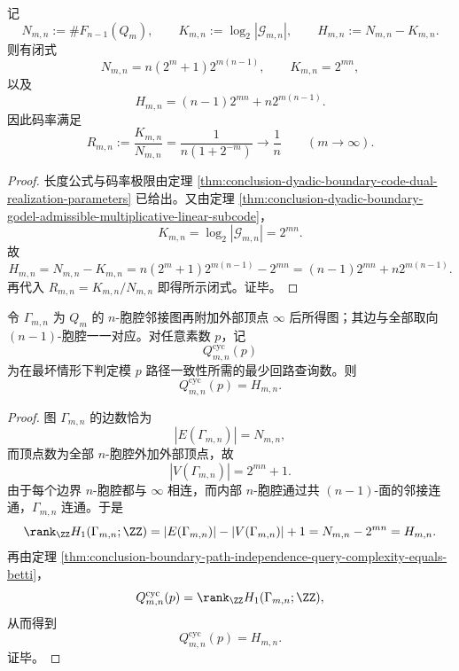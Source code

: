 \begin{corollary}\label{cor:conclusion-dyadic-boundary-godel-code-parameters-and-check-rank}
记
\[
N_{m,n}:=\#F_{n-1}(Q_m),
\qquad
K_{m,n}:=\log_2|\mathcal G_{m,n}|,
\qquad
H_{m,n}:=N_{m,n}-K_{m,n}.
\]
则有闭式
\[
N_{m,n}=n(2^m+1)2^{m(n-1)},
\qquad
K_{m,n}=2^{mn},
\]
以及
\[
H_{m,n}=(n-1)2^{mn}+n2^{m(n-1)}.
\]
因此码率满足
\[
R_{m,n}:=\frac{K_{m,n}}{N_{m,n}}
=
\frac{1}{n(1+2^{-m})}
\longrightarrow
\frac1n
\qquad (m\to\infty).
\]
\end{corollary}

\begin{proof}
长度公式与码率极限由定理 \ref{thm:conclusion-dyadic-boundary-code-dual-realization-parameters} 已给出。又由定理 \ref{thm:conclusion-dyadic-boundary-godel-admissible-multiplicative-linear-subcode}，
\[
K_{m,n}=\log_2|\mathcal G_{m,n}|=2^{mn}.
\]
故
\[
H_{m,n}=N_{m,n}-K_{m,n}
=
n(2^m+1)2^{m(n-1)}-2^{mn}
=
(n-1)2^{mn}+n2^{m(n-1)}.
\]
再代入 \(R_{m,n}=K_{m,n}/N_{m,n}\) 即得所示闭式。证毕。
\end{proof}

\begin{theorem}\label{thm:conclusion-dyadic-boundary-path-consistency-query-rank-equals-check-rank}
令 \(\Gamma_{m,n}\) 为 \(Q_m\) 的 \(n\)-胞腔邻接图再附加外部顶点 \(\infty\) 后所得图；其边与全部取向 \((n-1)\)-胞腔一一对应。对任意素数 \(p\)，记
\[
Q_{m,n}^{\mathrm{cyc}}(p)
\]
为在最坏情形下判定模 \(p\) 路径一致性所需的最少回路查询数。则
\[
Q_{m,n}^{\mathrm{cyc}}(p)=H_{m,n}.
\]
\end{theorem}

\begin{proof}
图 \(\Gamma_{m,n}\) 的边数恰为
\[
|E(\Gamma_{m,n})|=N_{m,n},
\]
而顶点数为全部 \(n\)-胞腔外加外部顶点，故
\[
|V(\Gamma_{m,n})|=2^{mn}+1.
\]
由于每个边界 \(n\)-胞腔都与 \(\infty\) 相连，而内部 \(n\)-胞腔通过共 \((n-1)\)-面的邻接连通，\(\Gamma_{m,n}\) 连通。于是
\[
\rank_{\ZZ}H_1(\Gamma_{m,n};\ZZ)
=
|E(\Gamma_{m,n})|-|V(\Gamma_{m,n})|+1
=
N_{m,n}-2^{mn}
=
H_{m,n}.
\]
再由定理 \ref{thm:conclusion-boundary-path-independence-query-complexity-equals-betti}，
\[
Q_{m,n}^{\mathrm{cyc}}(p)=\rank_{\ZZ}H_1(\Gamma_{m,n};\ZZ),
\]
从而得到
\[
Q_{m,n}^{\mathrm{cyc}}(p)=H_{m,n}.
\]
证毕。
\end{proof}

